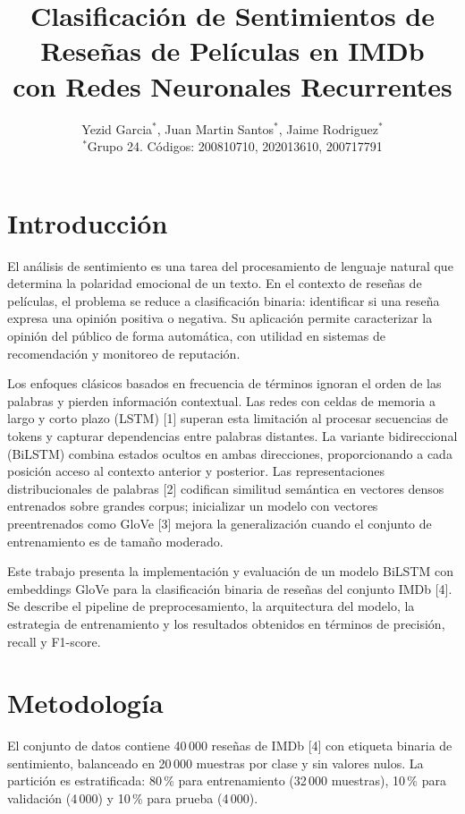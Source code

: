 \documentclass[letterpaper, 10pt, conference]{ieeeconf}
\title{\LARGE \bf
Clasificaci\'on de Sentimientos de Rese\~nas de Pel\'iculas en IMDb\\
con Redes Neuronales Recurrentes
}
\author{
  Yezid Garcia$^{*}$, Juan Martin Santos$^{*}$, Jaime Rodriguez$^{*}$ \\
  $^{*}$Grupo 24. C\'odigos: 200810710, 202013610, 200717791
}
\begin{document}
\maketitle
\thispagestyle{empty}
\pagestyle{empty}

\section{Introducci\'on}

El an\'alisis de sentimiento es una tarea del procesamiento de lenguaje natural
que determina la polaridad emocional de un texto. En el contexto de rese\~nas
de pel\'iculas, el problema se reduce a clasificaci\'on binaria: identificar si
una rese\~na expresa una opini\'on positiva o negativa. Su aplicaci\'on permite
caracterizar la opini\'on del p\'ublico de forma autom\'atica, con utilidad en
sistemas de recomendaci\'on y monitoreo de reputaci\'on.

Los enfoques cl\'asicos basados en frecuencia de t\'erminos ignoran el orden de
las palabras y pierden informaci\'on contextual. Las redes con celdas de memoria
a largo y corto plazo (LSTM) [1] superan esta limitaci\'on al procesar
secuencias de tokens y capturar dependencias entre palabras distantes. La
variante bidireccional (BiLSTM) combina estados ocultos en ambas direcciones,
proporcionando a cada posici\'on acceso al contexto anterior y posterior. Las
representaciones distribucionales de palabras [2] codifican similitud
sem\'antica en vectores densos entrenados sobre grandes corpus; inicializar un
modelo con vectores preentrenados como GloVe [3] mejora la generalizaci\'on
cuando el conjunto de entrenamiento es de tama\~no moderado.

Este trabajo presenta la implementaci\'on y evaluaci\'on de un modelo BiLSTM
con embeddings GloVe para la clasificaci\'on binaria de rese\~nas del conjunto
IMDb [4]. Se describe el pipeline de preprocesamiento, la arquitectura del
modelo, la estrategia de entrenamiento y los resultados obtenidos en t\'erminos
de precisi\'on, recall y F1-score.

\section{Metodolog\'ia}

El conjunto de datos contiene 40\,000 rese\~nas de IMDb [4] con etiqueta
binaria de sentimiento, balanceado en 20\,000 muestras por clase y sin valores
nulos. La partici\'on es estratificada: 80\,\% para entrenamiento (32\,000
muestras), 10\,\% para validaci\'on (4\,000) y 10\,\% para prueba (4\,000).
\end{document}
